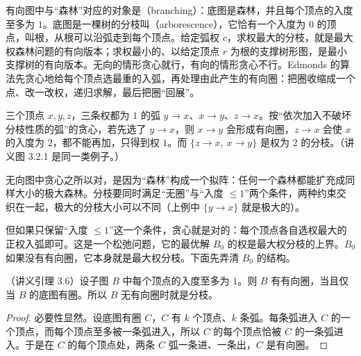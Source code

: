 \label{lec:branchings}

有向图中与“森林”对应的对象是（branching）：底图是森林，并且每个顶点的入度至多为 $1$。底图是一棵树的分枝叫（arborescence），它恰有一个入度为 $0$ 的顶点，叫根，从根可以沿弧走到每个顶点。给定弧权 $c$，求权最大的分枝，就是最大权森林问题的有向版本；求权最小的、以给定顶点 $r$ 为根的支撑树形图，是最小支撑树的有向版本。无向的情形贪心就行，有向的情形贪心不行。Edmonds 的算法先贪心地给每个顶点选最重的入弧，再处理由此产生的有向圈：把圈收缩成一个点、改一改权，递归求解，最后把圈“回展”。


\begin{example}\label{ex:branchings:greedy}
三个顶点 $x,y,z$，三条权都为 $1$ 的弧 $y\to x$、$x\to y$、$z\to x$。按“依次加入不破坏分枝性质的弧”的贪心，若先选了 $y\to x$，则 $x\to y$ 会形成有向圈，$z\to x$ 会使 $x$ 的入度为 $2$，都不能再加，只得到权 $1$。而 $\{z\to x,\ x\to y\}$ 是权为 $2$ 的分枝。（讲义图 3.2.1 是同一类例子。）
\end{example}

无向图中贪心之所以对，是因为“森林”构成一个拟阵：任何一个森林都能扩充成同样大小的极大森林。分枝要同时满足“无圈”与“入度 $\leqslant1$”两个条件，两种约束交织在一起，极大的分枝大小可以不同（上例中 $\{y\to x\}$ 就是极大的）。

但如果只保留“入度 $\leqslant1$”这一个条件，贪心就是对的：每个顶点各自选权最大的正权入弧即可。这是一个松弛问题，它的最优解 $B_0$ 的权是最大权分枝的上界。$B_0$ 如果没有有向圈，它本身就是最大权分枝。下面先弄清 $B_0$ 的结构。

\begin{lemma}\label{lem:branchings:cycle}
（讲义引理 3.6）设子图 $B$ 中每个顶点的入度至多为 $1$。则 $B$ 有有向圈，当且仅当 $B$ 的底图有圈。所以 $B$ 无有向圈时就是分枝。
\end{lemma}
\begin{proof}
必要性显然。设底图有圈 $C$，$C$ 有 $k$ 个顶点、$k$ 条弧。每条弧进入 $C$ 的一个顶点，而每个顶点至多被一条弧进入，所以 $C$ 的每个顶点恰被 $C$ 的一条弧进入。于是在 $C$ 的每个顶点处，两条 $C$ 弧一条进、一条出，$C$ 是有向圈。
\end{proof}

